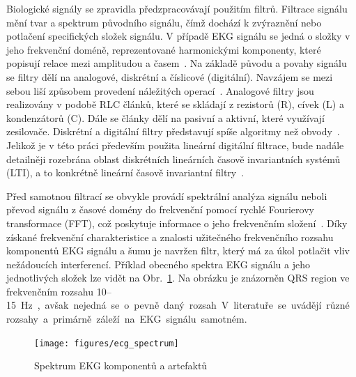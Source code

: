Biologické signály se zpravidla předzpracovávají použitím filtrů. Filtrace
signálu mění tvar a spektrum původního signálu, čímž dochází k zvýraznění nebo
potlačení specifických složek signálu. V případě EKG signálu se jedná o složky v
jeho frekvenční doméně, reprezentované harmonickými komponenty, které popisují
relace mezi amplitudou a časem~\cite{Jan2002}. Na základě původu a povahy
signálu se filtry dělí na analogové, diskrétní a číslicové (digitální). Navzájem
se mezi sebou liší způsobem provedení náležitých operací~\cite{Skop1994}.
Analogové filtry jsou realizovány v podobě RLC článků, které se skládají z
rezistorů (R), cívek (L) a kondenzátorů (C). Dále se články dělí na pasivní a
aktivní, které využívají zesilovače. Diskrétní a digitální filtry představují
spíše algoritmy než obvody~\cite{Prchal2000}. Jelikož je v této práci především
použita lineární digitální filtrace, bude nadále detailněji rozebrána oblast
diskrétních lineárních časově invariantních systémů (LTI), a to konkrétně
lineární časově invariantní filtry~\cite{Jan2002}.

Před samotnou filtrací se obvykle provádí spektrální analýza signálu neboli
převod signálu z časové domény do frekvenční pomocí rychlé Fourierovy transformace
(FFT), což poskytuje informace o jeho frekvenčním složení~\cite{Prchal2000}.
Díky získané frekvenční charakteristice a znalosti užitečného frekvenčního
rozsahu komponentů EKG signálu a šumu je navržen filtr, který má za úkol
potlačit vliv nežádoucích interferencí. Příklad obecného spektra EKG signálu a
jeho jednotlivých složek lze vidět na Obr.~\ref{fig:ecg_spectrum}. Na obrázku je
znázorněn QRS region ve frekvenčním rozsahu 10--15~\si\Hz,~avšak nejedná se o
pevně daný rozsah. V literatuře se uvádějí různé rozsahy a primárně záleží na
EKG signálu samotném.

\begin{figure}[h]
	\begin{center}
		\texttt{[image: figures/ecg\_spectrum]}
		\caption{Spektrum EKG komponentů a artefaktů}
		\label{fig:ecg_spectrum}
	\end{center}
\end{figure}

